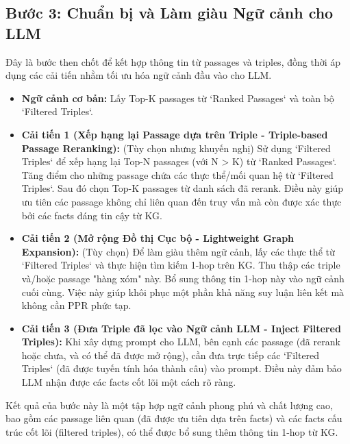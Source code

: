 \documentclass[../main.tex]{subfiles}
\begin{document}
\subsection{Bước 3: Chuẩn bị và Làm giàu Ngữ cảnh cho LLM}
Đây là bước then chốt để kết hợp thông tin từ passages và triples, đồng thời áp dụng các cải tiến nhằm tối ưu hóa ngữ cảnh đầu vào cho LLM.
\begin{itemize}
    \item \textbf{Ngữ cảnh cơ bản:} Lấy Top-K passages từ `Ranked Passages` và toàn bộ `Filtered Triples`.
    \item \textbf{Cải tiến 1 (Xếp hạng lại Passage dựa trên Triple - Triple-based Passage Reranking):} (Tùy chọn nhưng khuyến nghị) Sử dụng `Filtered Triples` để xếp hạng lại Top-N passages (với N > K) từ `Ranked Passages`. Tăng điểm cho những passage chứa các thực thể/mối quan hệ từ `Filtered Triples`. Sau đó chọn Top-K passages từ danh sách đã rerank. Điều này giúp ưu tiên các passage không chỉ liên quan đến truy vấn mà còn được xác thực bởi các facts đáng tin cậy từ KG.
    \item \textbf{Cải tiến 2 (Mở rộng Đồ thị Cục bộ - Lightweight Graph Expansion):} (Tùy chọn) Để làm giàu thêm ngữ cảnh, lấy các thực thể từ `Filtered Triples` và thực hiện tìm kiếm 1-hop trên KG. Thu thập các triple và/hoặc passage "hàng xóm" này. Bổ sung thông tin 1-hop này vào ngữ cảnh cuối cùng. Việc này giúp khôi phục một phần khả năng suy luận liên kết mà không cần PPR phức tạp.
    \item \textbf{Cải tiến 3 (Đưa Triple đã lọc vào Ngữ cảnh LLM - Inject Filtered Triples):} Khi xây dựng prompt cho LLM, bên cạnh các passage (đã rerank hoặc chưa, và có thể đã được mở rộng), cần đưa trực tiếp các `Filtered Triples` (đã được tuyến tính hóa thành câu) vào prompt. Điều này đảm bảo LLM nhận được các facts cốt lõi một cách rõ ràng.
\end{itemize}
Kết quả của bước này là một tập hợp ngữ cảnh phong phú và chất lượng cao, bao gồm các passage liên quan (đã được ưu tiên dựa trên facts) và các facts cấu trúc cốt lõi (filtered triples), có thể được bổ sung thêm thông tin 1-hop từ KG.
\end{document}
